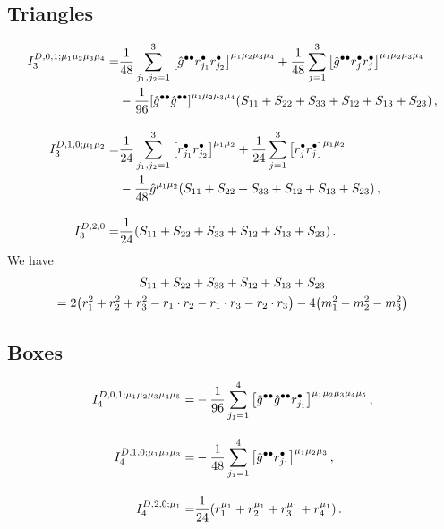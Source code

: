 \subsection*{Triangles}
\begin{subequations}
\begin{align}
  I_3^{D,0,1;\mu_1\mu_2\mu_3\mu_4} =& \frac{1}{48}\sum_{j_1,j_2=1}^3\qty[\hat{g}^{\bullet\bullet}r_{j_1}^\bullet r_{j_2}^\bullet]^{\mu_1\mu_2\mu_3\mu_4} + \frac{1}{48}\sum_{j=1}^3\qty[\hat{g}^{\bullet\bullet}r_j^\bullet r_j^\bullet]^{\mu_1\mu_2\mu_3\mu_4}\notag\\
    &-\frac{1}{96}\qty[\hat{g}^{\bullet\bullet}\hat{g}^{\bullet\bullet}]^{\mu_1\mu_2\mu_3\mu_4}\qty(S_{11}+S_{22}+S_{33}+S_{12}+S_{13}+S_{23})\,,\\[10pt]
%
  I_3^{D,1,0;\mu_1\mu_2} =& \frac{1}{24}\sum_{j_1,j_2=1}^3\qty[r_{j_1}^\bullet r_{j_2}^\bullet]^{\mu_1\mu_2} + \frac{1}{24}\sum_{j=1}^3\qty[r_j^\bullet r_j^\bullet]^{\mu_1\mu_2}\notag\\
    &-\frac{1}{48}\hat{g}^{\mu_1\mu_2}\qty(S_{11}+S_{22}+S_{33}+S_{12}+S_{13}+S_{23})\,,\\[10pt]
%
  I_3^{D,2,0} =& \frac{1}{24}\qty(S_{11}+S_{22}+S_{33}+S_{12}+S_{13}+S_{23})\,.
\end{align}
\end{subequations}
We have
\begin{multline}
  S_{11}+S_{22}+S_{33}+S_{12}+S_{13}+S_{23} \\= 2\qty(r_1^2+r_2^2+r_3^2-r_1\cdot r_2-r_1\cdot r_3-r_2\cdot r_3)-4\qty(m_1^2-m_2^2-m_3^2)
\end{multline}

\subsection*{Boxes}
\begin{subequations}
\begin{align}
  I_4^{D,0,1;\mu_1\mu_2\mu_3\mu_4\mu_5} =& -\frac{1}{96}\sum_{j_1=1}^4\qty[\hat{g}^{\bullet\bullet}\hat{g}^{\bullet\bullet}r_{j_1}^\bullet]^{\mu_1\mu_2\mu_3\mu_4\mu_5}\,,\\[10pt]
%
  I_4^{D,1,0;\mu_1\mu_2\mu_3} =& -\frac{1}{48}\sum_{j_1=1}^4\qty[\hat{g}^{\bullet\bullet}r_{j_1}^\bullet]^{\mu_1\mu_2\mu_3}\,,\\[10pt]
%
  I_4^{D,2,0;\mu_1} =& \frac{1}{24}\qty(r_1^{\mu_1}+r_2^{\mu_1}+r_3^{\mu_1}+r_4^{\mu_1})\,.
\end{align}
\end{subequations}

